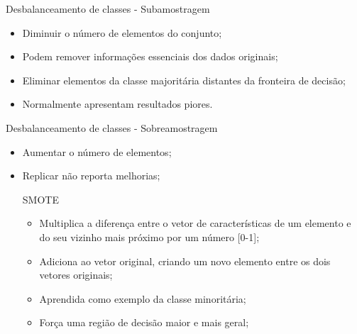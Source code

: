 \documentclass{beamer}
\begin{document}
\begin{frame}{Desbalanceamento de classes - Subamostragem}
\setlength\leftmargini{0em}
\justifying
    \begin{itemize}
        \item Diminuir o número de elementos do conjunto;
        \item Podem remover informações essenciais dos dados originais;
        \item Eliminar elementos da classe majoritária distantes da fronteira de decisão;
        \item Normalmente apresentam resultados piores.
    \end{itemize}
\end{frame}
\begin{frame}{Desbalanceamento de classes - Sobreamostragem}
\setlength\leftmargini{0em}
\justifying
    \begin{itemize}
        \item Aumentar o número de elementos;
        \item Replicar não reporta melhorias;
    \begin{block}{SMOTE}
\setlength\leftmargini{1em}
        \begin{itemize}
            \item Multiplica a diferença entre o vetor de características de um elemento e do seu vizinho mais próximo por um número [0-1];
            \item Adiciona ao vetor original, criando um novo elemento entre os dois vetores originais;
            \item Aprendida como exemplo da classe minoritária;
            \item Força uma região de decisão maior e mais geral;
        \end{itemize}
    \end{block}
    \end{itemize}
\end{frame}
\end{document}
